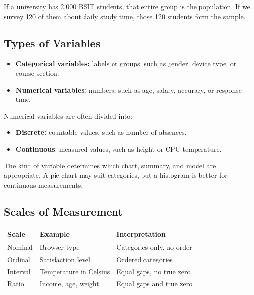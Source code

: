 \documentclass[11pt,a4paper]{article}
\begin{document}
\begin{examplebox}
If a university has 2,000 BSIT students, that entire group is the population. If we survey 120 of them about daily study time, those 120 students form the sample.
\end{examplebox}

\subsection{Types of Variables}

\begin{itemize}[leftmargin=*]
  \item \textbf{Categorical variables:} labels or groups, such as gender, device type, or course section.
  \item \textbf{Numerical variables:} numbers, such as age, salary, accuracy, or response time.
\end{itemize}

Numerical variables are often divided into:

\begin{itemize}[leftmargin=*]
  \item \textbf{Discrete:} countable values, such as number of absences.
  \item \textbf{Continuous:} measured values, such as height or CPU temperature.
\end{itemize}

\begin{conceptbox}
The kind of variable determines which chart, summary, and model are appropriate. A pie chart may suit categories, but a histogram is better for continuous measurements.
\end{conceptbox}

\subsection{Scales of Measurement}

\begin{longtable}{L{2.5cm}L{3.3cm}L{5.4cm}}
\toprule
\textbf{Scale} & \textbf{Example} & \textbf{Interpretation} \\
\midrule
Nominal & Browser type & Categories only, no order \\
Ordinal & Satisfaction level & Ordered categories \\
Interval & Temperature in Celsius & Equal gaps, no true zero \\
Ratio & Income, age, weight & Equal gaps and true zero \\
\bottomrule
\end{longtable}
\end{document}
